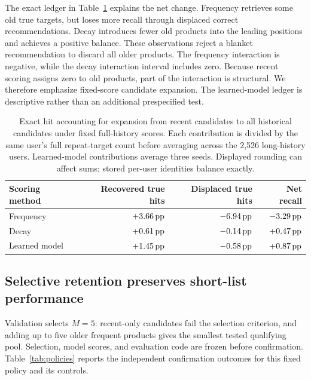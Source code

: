 The exact ledger in Table~\ref{tab:ledger} explains the net change. Frequency retrieves some old true targets, but loses more recall through displaced correct recommendations. Decay introduces fewer old products into the leading positions and achieves a positive balance. These observations reject a blanket recommendation to discard all older products. The frequency interaction is negative, while the decay interaction interval includes zero. Because recent scoring assigns zero to old products, part of the interaction is structural. We therefore emphasize fixed-score candidate expansion. The learned-model ledger is descriptive rather than an additional prespecified test.

\begin{table}[tbp]
  \centering
  \caption{Exact hit accounting for expansion from recent candidates to all historical candidates under fixed full-history scores. Each contribution is divided by the same user's full repeat-target count before averaging across the 2,526 long-history users. Learned-model contributions average three seeds. Displayed rounding can affect sums; stored per-user identities balance exactly.}
  \label{tab:ledger}
  \small
  \begin{tabularx}{\linewidth}{@{}Xrrr@{}}
    \toprule
    Scoring method & Recovered true hits & Displaced true hits & Net recall \\
    \midrule
    Frequency & $+3.66\,\text{pp}$ & $-6.94\,\text{pp}$ & $-3.29\,\text{pp}$ \\
    Decay & $+0.61\,\text{pp}$ & $-0.14\,\text{pp}$ & $+0.47\,\text{pp}$ \\
    Learned model & $+1.45\,\text{pp}$ & $-0.58\,\text{pp}$ & $+0.87\,\text{pp}$ \\
    \bottomrule
  \end{tabularx}
\end{table}

\subsection{Selective retention preserves short-list performance}
Validation selects $M=5$: recent-only candidates fail the selection criterion, and adding up to five older frequent products gives the smallest tested qualifying pool. Selection, model scores, and evaluation code are frozen before confirmation. Table~\ref{tab:policies} reports the independent confirmation outcomes for this fixed policy and its controls.

